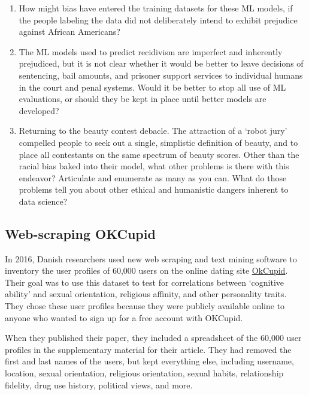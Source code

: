 \documentclass[
]{book}
\begin{document}
\begin{enumerate}
\def\labelenumi{\arabic{enumi}.}
\item
  How might bias have entered the training datasets for these ML models, if the people labeling the data did not deliberately intend to exhibit prejudice against African Americans?
\item
  The ML models used to predict recidivism are imperfect and inherently prejudiced, but it is not clear whether it would be better to leave decisions of sentencing, bail amounts, and prisoner support services to individual humans in the court and penal systems. Would it be better to stop all use of ML evaluations, or should they be kept in place until better models are developed?
\item
  Returning to the beauty contest debacle. The attraction of a `robot jury' compelled people to seek out a single, simplistic definition of beauty, and to place all contestants on the same spectrum of beauty scores. Other than the racial bias baked into their model, what other problems is there with this endeavor? Articulate and enumerate as many as you can. What do those problems tell you about other ethical and humanistic dangers inherent to data science?
\end{enumerate}

\hypertarget{web-scraping-okcupid}{%
\subsection*{Web-scraping OKCupid}\label{web-scraping-okcupid}}

In 2016, Danish researchers used new web scraping and text mining software to inventory the user profiles of 60,000 users on the online dating site \href{https://fortune.com/2016/05/18/okcupid-data-research/}{OkCupid}. Their goal was to use this dataset to test for correlations between `cognitive ability' and sexual orientation, religious affinity, and other personality traits. They chose these user profiles because they were publicly available online to anyone who wanted to sign up for a free account with OKCupid.

When they published their paper, they included a spreadsheet of the 60,000 user profiles in the supplementary material for their article. They had removed the first and last names of the users, but kept everything else, including username, location, sexual orientation, religious orientation, sexual habits, relationship fidelity, drug use history, political views, and more.
\end{document}
